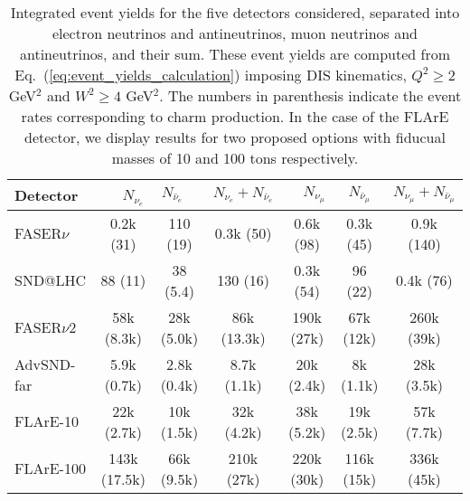 \begin{table}[t]
  \centering
  \small
  \renewcommand{\arraystretch}{1.70}
\begin{tabularx}{\textwidth}{X|c|c|c|c|c|c}
\toprule
Detector & $\quad$ $N_{\nu_e}$ $\quad$ &$\quad$ $N_{\bar{\nu}_e}$$\quad$   &   $N_{\nu_e} + N_{\bar{\nu}_e}$ &
$\quad$$N_{\nu_\mu}$ $\quad$ & $\quad$ $N_{\bar{\nu}_\mu}$ $\quad$  &   $N_{\nu_\mu} + N_{\bar{\nu}_\mu}$ \\
\midrule
\midrule
FASER$\nu$  & 0.2k (31)    & 110 (19)  & 0.3k (50)  &  0.6k (98)  &  0.3k (45)  &  0.9k (140) \\
SND@LHC  &  88 (11)  & 38 (5.4)    & 130 (16)   &  0.3k (54) & 96 (22)   &  0.4k  (76)\\
\midrule
\midrule
FASER$\nu$2  & 58k (8.3k)   & 28k (5.0k)   & 86k (13.3k)  & 190k (27k)  & 67k (12k)    & 260k (39k)   \\
AdvSND-far  &  5.9k (0.7k)  & 2.8k (0.4k)   & 8.7k (1.1k)  & 20k (2.4k)  & 8k (1.1k)   & 28k (3.5k)   \\
FLArE-10 & 22k (2.7k) & 10k (1.5k)   &  32k (4.2k) &  38k (5.2k)&   19k (2.5k) &   57k (7.7k) \\
FLArE-100 &   143k (17.5k)         &    66k (9.5k)         &       210k (27k)       &   220k (30k)      &  116k (15k)    &  336k (45k)  \\
  \bottomrule
\end{tabularx}
\vspace{0.2cm}
\caption{\small Integrated event yields for the five detectors considered,
  separated into electron neutrinos and antineutrinos,
  muon neutrinos and antineutrinos, and their sum.
  These event yields are computed from Eq.~(\ref{eq:event_yields_calculation})
  imposing DIS kinematics, $Q^2 \ge 2$ GeV$^2$ and $W^2 \ge 4$ GeV$^2$.
 The numbers in parenthesis indicate the event rates corresponding to charm
 production.
 In the case of the FLArE detector, we display results for two proposed
 options with fiducual masses of 10 and 100 tons respectively.
  \label{tab:integrated_rates}
}
\end{table}
